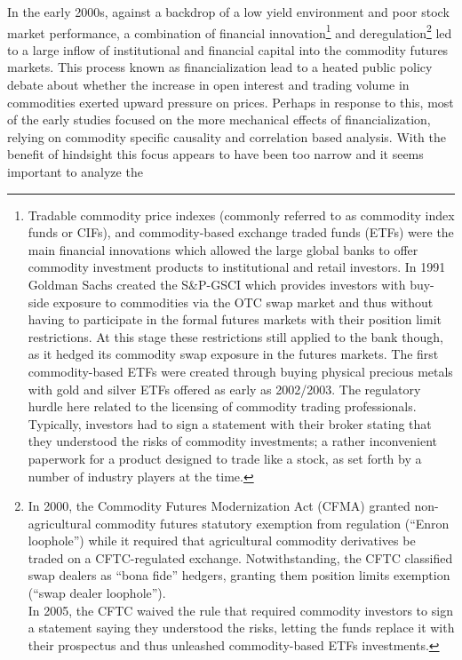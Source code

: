 \documentclass[12pt,]{article}
\let\rmarkdownfootnote\footnote%
\def\footnote{\protect\rmarkdownfootnote}
\begin{document}
In the early 2000s, against a backdrop of a low yield environment and
poor stock market performance, a combination of financial
innovation\footnote{Tradable commodity price indexes (commonly referred
  to as commodity index funds or CIFs), and commodity-based exchange
  traded funds (ETFs) were the main financial innovations which allowed
  the large global banks to offer commodity investment products to
  institutional and retail investors. In 1991 Goldman Sachs created the
  S\&P-GSCI which provides investors with buy-side exposure to
  commodities via the OTC swap market and thus without having to
  participate in the formal futures markets with their position limit
  restrictions. At this stage these restrictions still applied to the
  bank though, as it hedged its commodity swap exposure in the futures
  markets. The first commodity-based ETFs were created through buying
  physical precious metals with gold and silver ETFs offered as early as
  2002/2003. The regulatory hurdle here related to the licensing of
  commodity trading professionals. Typically, investors had to sign a
  statement with their broker stating that they understood the risks of
  commodity investments; a rather inconvenient paperwork for a product
  designed to trade like a stock, as set forth by a number of industry
  players at the time.} and deregulation\footnote{In 2000, the Commodity
  Futures Modernization Act (CFMA) granted non-agricultural commodity
  futures statutory exemption from regulation (``Enron loophole'') while
  it required that agricultural commodity derivatives be traded on a
  CFTC-regulated exchange. Notwithstanding, the CFTC classified swap
  dealers as ``bona fide'' hedgers, granting them position limits
  exemption (``swap dealer loophole'').\\
  In 2005, the CFTC waived the rule that required commodity investors to
  sign a statement saying they understood the risks, letting the funds
  replace it with their prospectus and thus unleashed commodity-based
  ETFs investments.} led to a large inflow of institutional and
financial capital into the commodity futures markets. This process known
as financialization lead to a heated public policy debate about whether
the increase in open interest and trading volume in commodities exerted
upward pressure on prices. Perhaps in response to this, most of the
early studies focused on the more mechanical effects of
financialization, relying on commodity specific causality and
correlation based analysis. With the benefit of hindsight this focus
appears to have been too narrow and it seems important to analyze the
\end{document}
